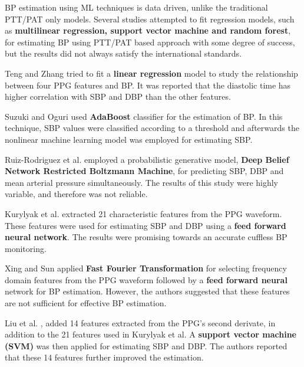 \documentclass[10pt, bibliography=totoc]{scrartcl}
\begin{document}
BP estimation using ML techniques is data driven, unlike the traditional PTT/PAT only models. Several studies attempted to fit regression models, such as \textbf{multilinear regression, support vector machine and random forest}, for estimating BP using PTT/PAT based approach with some degree of success, but the results did not always satisfy the international standards.\newline

Teng and Zhang \cite{tengContinuousNoninvasiveEstimation2003} tried to fit a \textbf{linear regression} model to study the relationship between four PPG features and BP. It was reported that the diastolic time has higher correlation with SBP and DBP than the other features.

Suzuki and Oguri \cite{suzukiCufflessBloodPressure2009} used \textbf{AdaBoost} classifier for the estimation of BP. In this technique, SBP values were classified according to a threshold and afterwards the nonlinear machine learning model was employed for estimating SBP.

Ruiz-Rodriguez et al. \cite{ruiz-rodriguezInnovativeContinuousNoninvasive2013} employed a probabilistic generative model, \textbf{Deep Belief Network Restricted Boltzmann Machine}, for predicting SBP, DBP and mean arterial pressure simultaneously. The results of this study were highly variable, and therefore was not reliable.

Kurylyak et al. \cite{kurylyakNeuralNetworkbasedMethod2013} extracted 21 characteristic features from the PPG waveform. These features were used for estimating SBP and DBP using a \textbf{feed forward neural network}. The results were promising towards an accurate cuffless BP monitoring.

Xing and Sun \cite{xingOpticalBloodPressure2016} applied \textbf{Fast Fourier Transformation} for selecting frequency domain features from the PPG waveform followed by a \textbf{feed forward neural} network for BP estimation. However, the authors suggested that these features are not sufficient for effective BP estimation.

Liu et al. \cite{liuIntegratedNavigationTethered2017}, added 14 features extracted from the PPG’s second derivate, in addition to the 21 features used in Kurylyak et al. A \textbf{support vector machine (SVM)} was then applied for estimating SBP and DBP. The authors reported that these 14 features further improved the estimation.\newline 
\end{document}
